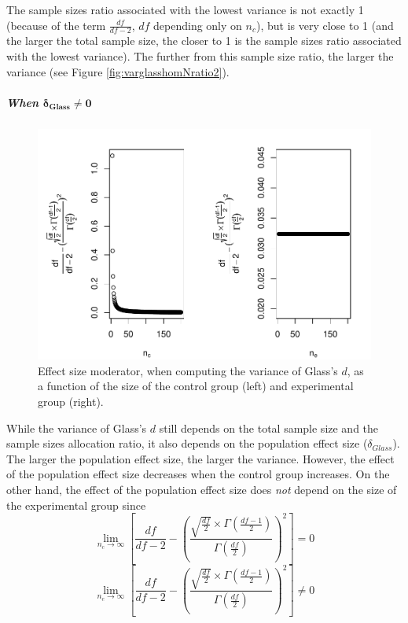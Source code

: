 \documentclass[
  english,
  man,mask]{apa6}
\let\oldsubparagraph\subparagraph
\renewcommand{\subparagraph}[1]{\oldsubparagraph{#1}\mbox{}}
\begin{document}
The sample sizes ratio associated with the lowest variance is not exactly 1 (because of the term \(\frac{df}{df-2}\), \(df\) depending only on \(n_c\)), but is very close to 1 (and the larger the total sample size, the closer to 1 is the sample sizes ratio associated with the lowest variance). The further from this sample size ratio, the larger the variance (see Figure \ref{fig:varglasshomNratio2}).

\hypertarget{when-bmdelta_glass-neq-0}{%
\subparagraph{\texorpdfstring{When \(\bm{\delta_{Glass} \neq 0}\)}{When \textbackslash bm\{\textbackslash delta\_\{Glass\} \textbackslash neq 0\}}}\label{when-bmdelta_glass-neq-0}}

\begin{figure}
\centering
\includegraphics{Theoretical-Bias-of-all-estimators-as-a-function-of-population-parameters_files/figure-latex/ESmoderatorGlassNsize2-1.pdf}
\caption{\label{fig:ESmoderatorGlassNsize2}Effect size moderator, when computing the variance of Glass's \(d\), as a function of the size of the control group (left) and experimental group (right).}
\end{figure}

While the variance of Glass's \(d\) still depends on the total sample size and the sample sizes allocation ratio, it also depends on the population effect size (\(\delta_{Glass}\)). The larger the population effect size, the larger the variance. However, the effect of the population effect size decreases when the control group increases. On the other hand, the effect of the population effect size does \emph{not} depend on the size of the experimental group since\\
\[\lim_{n_c\rightarrow \infty}\left[\frac{df}{df-2} - \left( \frac{\sqrt{\frac{df}{2}} \times \Gamma \left(\frac{df-1}{2} \right)}{\Gamma \left( \frac{df}{2}\right)}\right)^2 \right]=0\]
\[\lim_{n_e\rightarrow \infty}\left[\frac{df}{df-2} - \left( \frac{\sqrt{\frac{df}{2}} \times \Gamma \left(\frac{df-1}{2} \right)}{\Gamma \left( \frac{df}{2}\right)}\right)^2 \right] \neq 0\]
\end{document}
